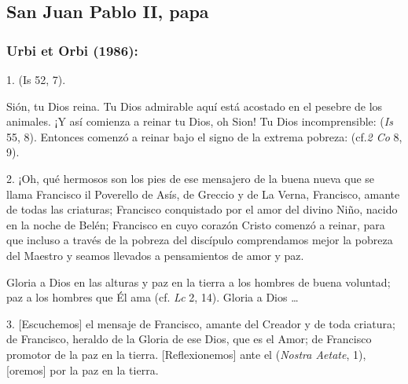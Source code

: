 \newsection 






\newsection

\subsection{San Juan Pablo II, papa}

\subsubsection{Urbi et Orbi (1986):}


\begin{body}
	1.  (Is 52, 7).
	
	 Sión, tu Dios reina. Tu Dios admirable aquí está acostado en el pesebre de los animales. ¡Y así comienza a reinar tu Dios, oh Sion! Tu Dios incomprensible:  (\emph{Is} 55, 8). Entonces comenzó a reinar bajo el signo de la extrema pobreza:  (cf.\emph{2 Co} 8, 9).
	
	2. ¡Oh, qué hermosos son los pies de ese mensajero de la buena nueva que se llama Francisco il Poverello de Asís, de Greccio y de La Verna, Francisco, amante de todas las criaturas; Francisco conquistado por el amor del divino Niño, nacido en la noche de Belén; Francisco en cuyo corazón Cristo comenzó a reinar, para que incluso a través de la pobreza del discípulo comprendamos mejor la pobreza del Maestro y seamos llevados a pensamientos de amor y paz.
	
	Gloria a Dios en las alturas y paz en la tierra a los hombres de buena voluntad; paz a los hombres que Él ama (cf. \emph{Lc} 2, 14). Gloria a Dios \ldots{}
	
	3. {[}Escuchemos{]} el mensaje de Francisco, amante del Creador y de toda criatura; de Francisco, heraldo de la Gloria de ese Dios, que  es el Amor; de Francisco promotor de la paz en la tierra. {[}Reflexionemos{]} ante el  ({\emph{Nostra Aetate}}, 1), {[}oremos{]} por la paz en la tierra.
	

\end{body}
